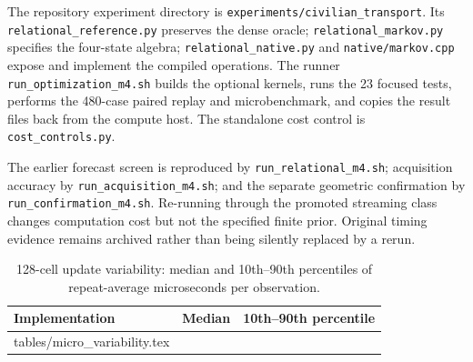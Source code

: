 \documentclass[journal]{IEEEtran}
\makeatletter
\newcommand{\inputrows}[1]{\@@input #1 }
\makeatother
\begin{document}
The repository experiment directory is
\texttt{experiments/civilian\_transport}. Its
\texttt{relational\_reference.py} preserves the dense oracle;
\texttt{relational\_markov.py} specifies the four-state algebra;
\texttt{relational\_native.py} and \texttt{native/markov.cpp} expose
and implement the compiled operations. The runner
\texttt{run\_optimization\_m4.sh} builds the optional kernels, runs the
23 focused tests, performs the 480-case paired replay and microbenchmark,
and copies the result files back from the compute host. The standalone
cost control is \texttt{cost\_controls.py}.

The earlier forecast screen is reproduced by
\texttt{run\_relational\_m4.sh}; acquisition accuracy by
\texttt{run\_acquisition\_m4.sh}; and the separate geometric
confirmation by \texttt{run\_confirmation\_m4.sh}. Re-running through
the promoted streaming class changes computation cost but not the
specified finite prior. Original timing evidence remains archived
rather than being silently replaced by a rerun.

\par\endgroup

\begin{table}[h]
\centering
\caption{128-cell update variability: median and 10th--90th percentiles
of repeat-average microseconds per observation.}
\label{tab:variability}
\small
\begin{tabular}{lrr}
\toprule Implementation & Median & 10th--90th percentile\\\midrule
\inputrows{tables/micro_variability.tex}
\bottomrule
\end{tabular}
\end{table}
\end{document}
